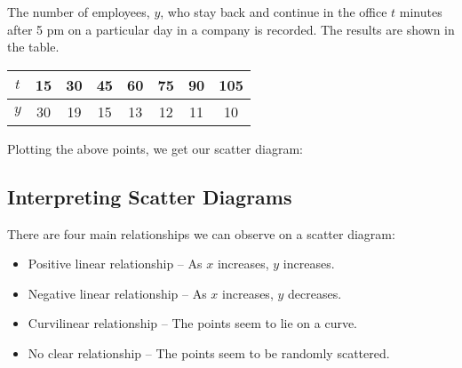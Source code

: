 \begin{example}
    The number of employees, $y$, who stay back and continue in the office $t$ minutes after 5 pm on a particular day in a company is recorded. The results are shown in the table.

    \begin{table}[H]
        \centering
        \begin{tabular}{|c|c|c|c|c|c|c|c|}
        \hline
        $t$ & 15 & 30 & 45 & 60 & 75 & 90 & 105 \\ \hline
        $y$ & 30 & 19 & 15 & 13 & 12 & 11 & 10 \\ \hline
        \end{tabular}
    \end{table}

    Plotting the above points, we get our scatter diagram:
    \begin{figure}[H]
        \centering
        \caption{}
    \end{figure}
\end{example}

\subsection{Interpreting Scatter Diagrams}

There are four main relationships we can observe on a scatter diagram:
\begin{itemize}
    \item Positive linear relationship -- As $x$ increases, $y$ increases.
    \item Negative linear relationship -- As $x$ increases, $y$ decreases.
    \item Curvilinear relationship -- The points seem to lie on a curve.
    \item No clear relationship -- The points seem to be randomly scattered.
\end{itemize}

